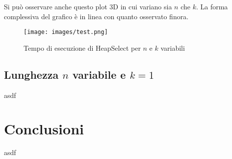\documentclass{article}
\begin{document}
	
	Si può osservare anche questo plot 3D in cui variano sia $n$ che $k$. La forma complessiva del grafico è in linea con quanto osservato finora.
	
	\begin{figure}[h!]
  		\texttt{[image: images/test.png]}
  		\caption{Tempo di esecuzione di HeapSelect per $n$ e $k$ variabili}
  		\label{fig:graph4}
	\end{figure}
		
	\newpage
	
	
	\subsection{Lunghezza $n$ variabile e $k=1$}
	asdf
	\newpage


	\section{Conclusioni}
	asdf
\end{document}
